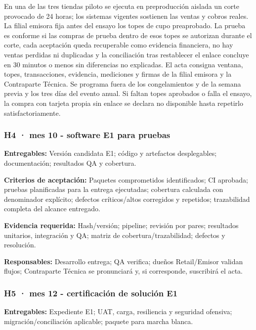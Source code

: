 \documentclass[11pt]{article}
\begin{document}
En una de las tres tiendas piloto se ejecuta en preproducción aislada un corte provocado de 24 horas; los sistemas vigentes sostienen las ventas y cobros reales. La filial emisora fija antes del ensayo los topes de cupo preaprobado. La prueba es conforme si las compras de prueba dentro de esos topes se autorizan durante el corte, cada aceptación queda recuperable como evidencia financiera, no hay ventas perdidas ni duplicadas y la conciliación tras restablecer el enlace concluye en 30 minutos o menos sin diferencias no explicadas. El acta consigna ventana, topes, transacciones, evidencia, mediciones y firmas de la filial emisora y la Contraparte Técnica. Se programa fuera de los congelamientos y de la semana previa y los tres días del evento anual. Si faltan topes aprobados o falla el ensayo, la compra con tarjeta propia sin enlace se declara no disponible hasta repetirlo satisfactoriamente.

\subsubsection{\texorpdfstring{\textbf{H4 · mes 10} - software E1 para pruebas}{H4 · mes 10 - software E1 para pruebas}}\label{t17-h4-mes-10-software-e1-para-pruebas}

\textbf{Entregables:} Versión candidata E1; código y artefactos desplegables; documentación; resultados QA y cobertura.

\textbf{Criterios de aceptación:} Paquetes comprometidos identificados; CI aprobada; pruebas planificadas para la entrega ejecutadas; cobertura calculada con denominador explícito; defectos críticos/altos corregidos y repetidos; trazabilidad completa del alcance entregado.

\textbf{Evidencia requerida:} Hash/versión; pipeline; revisión por pares; resultados unitarios, integración y QA; matriz de cobertura/trazabilidad; defectos y resolución.

\textbf{Responsables:} Desarrollo entrega; QA verifica; dueños Retail/Emisor validan flujos; Contraparte Técnica se pronunciará y, si corresponde, suscribirá el acta.

\subsubsection{\texorpdfstring{\textbf{H5 · mes 12} - certificación de solución E1}{H5 · mes 12 - certificación de solución E1}}\label{t17-h5-mes-12-certificaciuxf3n-de-soluciuxf3n-e1}

\textbf{Entregables:} Expediente E1; UAT, carga, resiliencia y seguridad ofensiva; migración/conciliación aplicable; paquete para marcha blanca.
\end{document}
